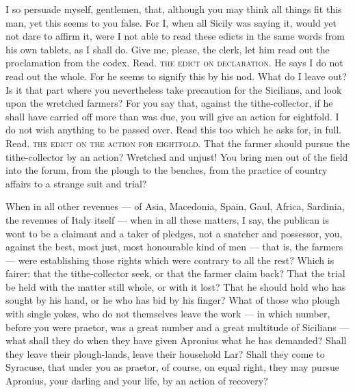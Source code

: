  I so persuade myself, gentlemen, that, although you may think all things fit this man, yet this seems to you false. For I, when all Sicily was saying it, would yet not dare to affirm it, were I not able to read these edicts in the same words from his own tablets, as I shall do. Give me, please, the clerk, let him read out the proclamation from the codex. Read. \textsc{the edict on declaration}. He says I do not read out the whole. For he seems to signify this by his nod. What do I leave out? Is it that part where you nevertheless take precaution for the Sicilians, and look upon the wretched farmers? For you say that, against the tithe-collector, if he shall have carried off more than was due, you will give an action for eightfold. I do not wish anything to be passed over. Read this too which he asks for, in full. Read. \textsc{the edict on the action for eightfold}. That the farmer should pursue the tithe-collector by an action? Wretched and unjust! You bring men out of the field into the forum, from the plough to the benches, from the practice of country affairs to a strange suit and trial?

 When in all other revenues --- of Asia, Macedonia, Spain, Gaul, Africa, Sardinia, the revenues of Italy itself --- when in all these matters, I say, the publican is wont to be a claimant and a taker of pledges, not a snatcher and possessor, you, against the best, most just, most honourable kind of men --- that is, the farmers --- were establishing those rights which were contrary to all the rest? Which is fairer: that the tithe-collector seek, or that the farmer claim back? That the trial be held with the matter still whole, or with it lost? That he should hold who has sought by his hand, or he who has bid by his finger? What of those who plough with single yokes, who do not themselves leave the work --- in which number, before you were praetor, was a great number and a great multitude of Sicilians --- what shall they do when they have given Apronius what he has demanded? Shall they leave their plough-lands, leave their household Lar? Shall they come to Syracuse, that under you as praetor, of course, on equal right, they may pursue Apronius, your darling and your life, by an action of recovery?

